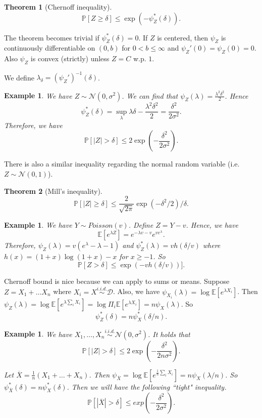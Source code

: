 \documentclass[10pt]{article}
\newcounter{lecnum}
\newtheorem{theorem}{Theorem}[lecnum]
\newtheorem{example}[ex]{Example}
\newcommand{\E}[1]{\mathbb{E}\!\left[#1\right]}
\renewcommand{\P}{\mathbb{P}}
\renewcommand{\bar}{\overline}
\begin{document}
\begin{theorem}[Chernoff inequality]
$$
\P[ Z \geq \delta ] \leq \exp( - \psi_Z^*(\delta) ).
$$
\end{theorem}

The theorem becomes trivial if $ \psi_Z^*(\delta) = 0$. If $Z$ is centered, then $\psi_Z$ is continuously differentiable on $(0, b)$ for $0 < b \leq \infty$ and $\psi_Z'(0) = \psi_Z(0) = 0$. Also $\psi_Z$ is convex (strictly) unless $Z = C$ w.p. $1$. 

We define $\lambda_{\delta} = ( \psi_Z' )^{-1}(\delta)$.

\begin{example}
We have $Z \sim \mathcal{N}(0, \sigma^2)$. We can find that $\psi_Z(\lambda) = \frac{\lambda^2 \delta^2}{2}$. Hence 
$$
\psi_Z^*(\delta) = \sup_{\lambda} \lambda \delta - \frac{\lambda^2 \delta^2}{2} = \frac{\delta^2}{ 2 \sigma^2}.
$$
Therefore, we have 
$$
\P[ |Z| > \delta ] \leq 2\exp\left( - \frac{\delta^2}{2 \sigma^2} \right).
$$
\end{example}

There is also a similar inequality regarding the normal random variable (i.e. $Z \sim \mathcal{N}(0, 1)$).

\begin{theorem}[Mill's inequality]
$$
\P[ |Z| \geq \delta ] \leq \frac{2}{\sqrt{2 \pi}} \exp( - \delta^2 / 2 ) / \delta.
$$
\end{theorem}

\begin{example}
We have $Y \sim Poisson(v)$. Define $Z = Y - v$. Hence, we have 
$$
\E{ e^{\lambda Z} } = e^{ - \lambda v - v} e^{ve^{\lambda}}.
$$
Therefore, $\psi_Z(\lambda) = v(e^{\lambda} - \lambda - 1)$ and $\psi_Z^*(\lambda) = v h(\delta / v)$ where $h(x) = (1 + x) \log (1 +x) - x $ for $x \geq -1$. So
$$
\P[ Z > \delta]  \leq \exp( - v h(\delta / v))].
$$
\end{example}


Chernoff bound is nice because we can apply to sums or means. Suppose $Z = X_1 + \dots X_n$ where $X_i  = X \stackrel{i.i.d.}{\sim} \mathcal{D}$. Also, we have $\psi_{X_i}(\lambda) = \log \E{ e^{\lambda X_i}}$. Then $\psi_Z(\lambda) = \log \E{ e^{\lambda \sum_i X_i}} = \log \Pi_i \E{ e^{\lambda X_i}} = n \psi_X(\lambda)$. So
$$
\psi_Z^*(\delta) = n \psi_X^*( \delta / n).
$$

\begin{example}
We have $X_1, \dots, X_n \stackrel{i.i.d.}{\sim} \mathcal{N}(0, \sigma^2)$. It holds that 
$$
\P[ |Z| > \delta ] \leq 2 \exp\left( - \frac{\delta^2}{2n\sigma^2} \right).
$$

Let $\bar{X} = \frac{1}{n} (X_1 + \dots + X_n)$. Then $\psi_{\bar{X}} = \log \E{ e^{\frac{1}{n} \sum_i X_i} } = n \psi_X( \lambda / n)$. So $\psi_{\bar{X}}^*(\delta) = n \psi_{X}^*(\delta)$. Then we will have the following ``tight" inequality.
$$
\P [ | \bar{X} | > \delta ] \leq exp\left( -\frac{\delta^2}{2 \sigma^2} \right). 
$$

\end{example}

%
%
\end{document}

